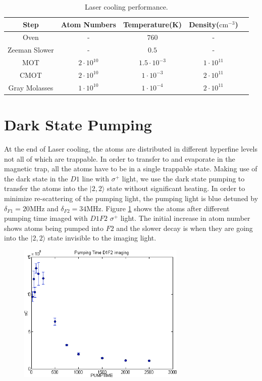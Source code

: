\begin{table}
  \begin{center}
    \begin{tabular}{|c|c|c|c|c|}\hline
      Step&Atom Numbers&Temperature(K)&Density($\text{cm}^{-3}$)\\\hline
      Oven&-&$760$&-\\\hline
      Zeeman Slower&-&$0.5$&-\\\hline
      MOT&$2\cdot10^{10}$&$1.5\cdot10^{-3}$&$1\cdot10^{11}$\\\hline
      CMOT&$2\cdot10^{10}$&$1\cdot10^{-3}$&$2\cdot10^{11}$\\\hline
      Gray Molasses&$1\cdot10^{10}$&$1\cdot10^{-4}$&$2\cdot10^{11}$\\\hline
    \end{tabular}
  \end{center}
  \caption{Laser cooling performance.}
  \label{exp:laser-cooling}
\end{table}

\section{Dark State Pumping}\label{exp:pump}

At the end of Laser cooling, the atoms are distributed in different hyperfine levels not all of which are trappable. In order to transfer to and evaporate in the magnetic trap, all the atoms have to be in a single trappable state. Making use of the dark state in the $D1$ line with $\sigma^+$ light, we use the dark state pumping to transfer the atoms into the $|2, 2\rangle$ state without significant heating. In order to minimize re-scattering of the pumping light, the pumping light is blue detuned by $\delta_{F1}=20\text{MHz}$ and $\delta_{F2}=34\text{MHz}$. Figure \ref{exp:mf-pump-time} shows the atoms after different pumping time imaged with $D1F2$ $\sigma^+$ light. The initial increase in atom number shows atoms being pumped into $F2$ and the slower decay is when they are going into the $|2, 2\rangle$ state invisible to the imaging light.
\begin{figure}
  \begin{center}
    \includegraphics[width=8cm]{mf-pump.png}
  \end{center}
  \caption{}
  \label{exp:mf-pump-time}
\end{figure}

